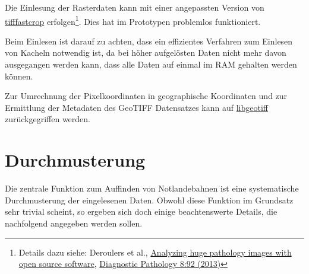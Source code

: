 \documentclass[
11pt, %
a4paper, %
oneside, %
pdfspacing, %
headinclude,
BCOR5mm, %
ngerman, %
bibtotocnumbered,
]{scrartcl}
\begin{document}
	Die Einlesung der Rasterdaten kann mit einer angepassten Version von \href{https://www.imnc.in2p3.fr/pagesperso/deroulers/software/largetifftools/tifffastcrop.html}{tifffastcrop} erfolgen\footnote{
	Details dazu siehe: Deroulers et al., \href{https://www.imnc.in2p3.fr/pagesperso/deroulers/software/ndpitools/article_diagnostic_pathology.pdf}{Analyzing huge pathology images with open source software}, \href{http://www.diagnosticpathology.org/content/8/1/92}{Diagnostic Pathology 8:92 (2013)}}. 
	Dies hat im Prototypen problemlos funktioniert.
	
	Beim Einlesen ist darauf zu achten, dass ein effizientes Verfahren zum Einlesen von Kacheln notwendig ist, da bei höher aufgelösten Daten nicht mehr davon ausgegangen werden kann, dass alle Daten auf einmal im RAM gehalten werden können.
	
	Zur Umrechnung der Pixelkoordinaten in geographische Koordinaten und zur Ermittlung der Metadaten des GeoTIFF Datensatzes kann auf \href{https://trac.osgeo.org/geotiff/}{libgeotiff} zurückgegriffen werden.
	
	\skippingparagraph
	\skippingparagraph	%
	
	

\section{Durchmusterung}

Die zentrale Funktion zum Auffinden von Notlandebahnen ist eine systematische Durchmusterung der eingelesenen Daten. Obwohl diese Funktion im Grundsatz sehr trivial scheint, so ergeben sich doch einige beachtenswerte Details, die nachfolgend angegeben werden sollen.
\end{document}
